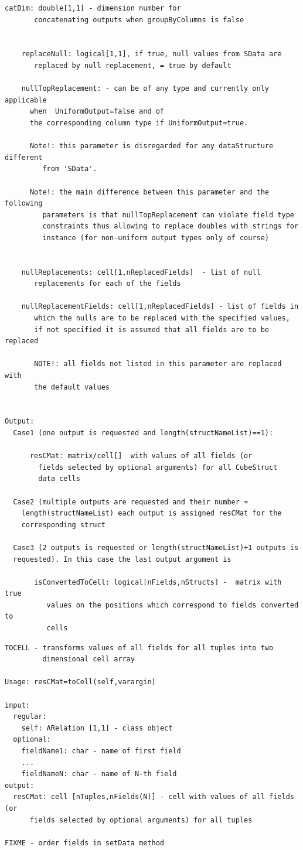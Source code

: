 \documentclass[letterpaper,10pt,english]{sphinxmanual}
\begin{document}
\begin{Verbatim}[commandchars=\\\{\}]
    catDim: double[1,1] - dimension number for
       concatenating outputs when groupByColumns is false


    replaceNull: logical[1,1], if true, null values from SData are
       replaced by null replacement, = true by default

    nullTopReplacement: - can be of any type and currently only applicable
      when  UniformOutput=false and of
      the corresponding column type if UniformOutput=true.

      Note!: this parameter is disregarded for any dataStructure different
         from 'SData'.

      Note!: the main difference between this parameter and the following
         parameters is that nullTopReplacement can violate field type
         constraints thus allowing to replace doubles with strings for
         instance (for non-uniform output types only of course)


    nullReplacements: cell[1,nReplacedFields]  - list of null
       replacements for each of the fields

    nullReplacementFields: cell[1,nReplacedFields] - list of fields in
       which the nulls are to be replaced with the specified values,
       if not specified it is assumed that all fields are to be replaced

       NOTE!: all fields not listed in this parameter are replaced with
       the default values


Output:
  Case1 (one output is requested and length(structNameList)==1):

      resCMat: matrix/cell[]  with values of all fields (or
        fields selected by optional arguments) for all CubeStruct
        data cells

  Case2 (multiple outputs are requested and their number =
    length(structNameList) each output is assigned resCMat for the
    corresponding struct

  Case3 (2 outputs is requested or length(structNameList)+1 outputs is
  requested). In this case the last output argument is

       isConvertedToCell: logical[nFields,nStructs] -  matrix with true
          values on the positions which correspond to fields converted to
          cells
\end{Verbatim}

\begin{Verbatim}[commandchars=\\\{\}]
TOCELL - transforms values of all fields for all tuples into two
         dimensional cell array

Usage: resCMat=toCell(self,varargin)

input:
  regular:
    self: ARelation [1,1] - class object
  optional:
    fieldName1: char - name of first field
    ...
    fieldNameN: char - name of N-th field
output:
  resCMat: cell [nTuples,nFields(N)] - cell with values of all fields (or
      fields selected by optional arguments) for all tuples

FIXME - order fields in setData method
\end{Verbatim}
\end{document}
